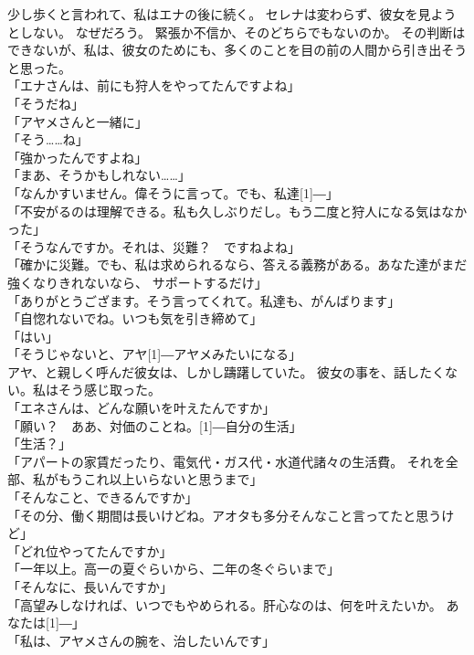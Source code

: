 \documentclass[../IHMain]{subfiles}
\begin{document}
少し歩くと言われて、私はエナの後に続く。
セレナは変わらず、彼女を見ようとしない。
なぜだろう。
緊張か不信か、そのどちらでもないのか。
その判断はできないが、私は、彼女のためにも、多くのことを目の前の人間から引き出そうと思った。\\
「エナさんは、前にも狩人をやってたんですよね」\\
「そうだね」\\
「アヤメさんと一緒に」\\
「そう……ね」\\
「強かったんですよね」\\
「まあ、そうかもしれない……」\\
「なんかすいません。偉そうに言って。でも、私達\scalebox{3}[1]{―}」\\
「不安がるのは理解できる。私も久しぶりだし。もう二度と狩人になる気はなかった」\\
「そうなんですか。それは、災難？　ですねよね」\\
「確かに災難。でも、私は求められるなら、答える義務がある。あなた達がまだ強くなりきれないなら、
サポートするだけ」\\
「ありがとうござます。そう言ってくれて。私達も、がんばります」\\
「自惚れないでね。いつも気を引き締めて」\\
「はい」\\
「そうじゃないと、アヤ\scalebox{3}[1]{―}アヤメみたいになる」\\
アヤ、と親しく呼んだ彼女は、しかし躊躇していた。
彼女の事を、話したくない。私はそう感じ取った。\\
「エネさんは、どんな願いを叶えたんですか」\\
「願い？　ああ、対価のことね。\scalebox{3}[1]{―}自分の生活」\\
「生活？」\\
「アパートの家賃だったり、電気代・ガス代・水道代諸々の生活費。
それを全部、私がもうこれ以上いらないと思うまで」\\
「そんなこと、できるんですか」\\
「その分、働く期間は長いけどね。アオタも多分そんなこと言ってたと思うけど」\\
「どれ位やってたんですか」\\
「一年以上。高一の夏ぐらいから、二年の冬ぐらいまで」\\
「そんなに、長いんですか」\\
「高望みしなければ、いつでもやめられる。肝心なのは、何を叶えたいか。
あなたは\scalebox{3}[1]{―}」\\
「私は、アヤメさんの腕を、治したいんです」\\
\end{document}
